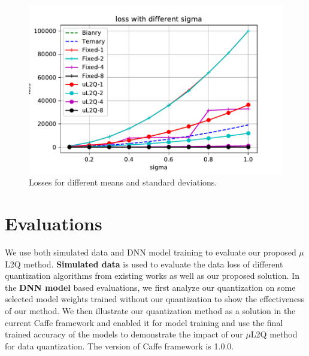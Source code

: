 \begin{figure}[!ht]
{\begin{minipage}[t]{0.3\textwidth}
        \includegraphics[width=1\textwidth]{Simulation/ShiftScale/loss_with_sigma_in_small_range.pdf}
        \end{minipage}
     }
    \caption{Losses for different means and standard deviations.}
    \label{fig:loss_with_distribution}
\end{figure}
\section{Evaluations}\label{sec:exp}
We use both simulated data and DNN model training to evaluate our proposed $\mu$L2Q method.
\textbf{Simulated data} is used to evaluate the data loss of different quantization algorithms from existing works as well as our proposed solution. 
In the \textbf{DNN model} based evaluations, we first analyze our quantization on some selected model weights trained without our quantization to show the effectiveness of our method. We then illustrate our quantization method as a solution in the current Caffe \citep{jia2014caffe} framework and enabled it for model training and use the final trained accuracy of the models to demonstrate the impact of our $\mu$L2Q method for data quantization. The version of Caffe framework is 1.0.0.

